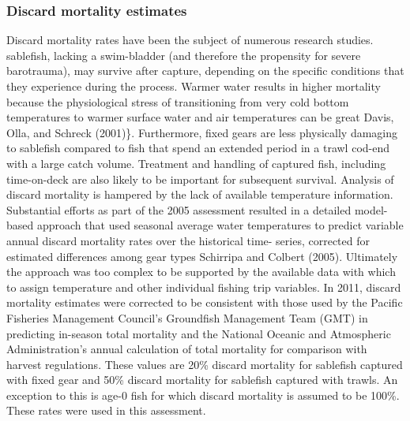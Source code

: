 \documentclass[11pt,
  english,
  a4paper,
]{article}
\begin{document}
\leavevmode\tagmcend\tagstructend\par


\hypertarget{discard-mortality-estimates}{%
\subsubsection{Discard mortality estimates}\label{discard-mortality-estimates}}

\leavevmode\tagmcend\tagstructend


Discard mortality rates have been the subject of numerous research studies. sablefish, lacking a swim-bladder (and therefore the propensity for severe barotrauma), may survive after capture, depending on the specific conditions that they experience during the process. Warmer water results in higher mortality because the physiological stress of transitioning from very cold bottom temperatures to warmer surface water and air temperatures can be great {Davis, Olla, and Schreck (2001)\leavevmode\tagmcend\tagstructend}\}. Furthermore, fixed gears are less physically damaging to sablefish compared to fish that spend an extended period in a trawl cod-end with a large catch volume. Treatment and handling of captured fish, including time-on-deck are also likely to be important for subsequent survival. Analysis of discard mortality is hampered by the lack of available temperature information. Substantial efforts as part of the 2005 assessment resulted in a detailed model-based approach that used seasonal average water temperatures to predict variable annual discard mortality rates over the historical time- series, corrected for estimated differences among gear types {Schirripa and Colbert (2005)\leavevmode\tagmcend\tagstructend}. Ultimately the approach was too complex to be supported by the available data with which to assign temperature and other individual fishing trip variables. In 2011, discard mortality estimates were corrected to be consistent with those used by the Pacific Fisheries Management Council's Groundfish Management Team (GMT) in predicting in-season total mortality and the National Oceanic and Atmospheric Administration's annual calculation of total mortality for comparison with harvest regulations. These values are 20\% discard mortality for sablefish captured with fixed gear and 50\% discard mortality for sablefish captured with trawls. An exception to this is age-0 fish for which discard mortality is assumed to be 100\%. These rates were used in this assessment.
\end{document}
